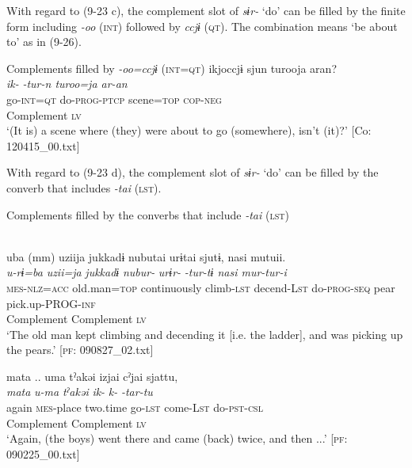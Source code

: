 With regard to (9-23 c), the complement slot of \textit{sɨr-} ‘do’ can be filled by the finite form including \textit{{}-oo} (\textsc{int}) followed by \textit{ccjɨ} (\textsc{qt}). The combination means ‘be about to’ as in (9-26).

\ea   Complements filled by \textit{{}-oo=ccjɨ} (\textsc{int}=\textsc{qt}) \label{ex:9.26}
 \gllll  ikjoccjɨ  sjun  turooja  aran?\\
    \textit{ik-}  \textit{-tur-n  turoo=ja  ar-an}\\
    go-\textsc{int}=\textsc{qt}  do-\textsc{prog}-\textsc{ptcp}  scene=\textsc{top}  \textsc{cop}-\textsc{neg}\\
    Complement  \textsc{lv}    \\
    \glt     ‘(It is) a scene where (they) were about to go (somewhere), isn’t (it)?’ [Co: 120415\_00.txt]
\z

  With regard to (9-23 d), the complement slot of \textit{sɨr-} ‘do’ can be filled by the converb that includes \textit{{}-tai} (\textsc{lst}).

\ea   Complements filled by the converbs that include \textit{{}-tai} (\textsc{lst}) \label{ex:9.27}

  \ea \label{ex:9.27a}\relax [= (8-93 b)]\\
    \gllll  uba  (mm)  uziija  jukkadɨ  nubutai  urɨtai  sjutɨ,  nasi  mutuii.\\
      \textit{u-rɨ=ba}    \textit{uzii=ja}  \textit{jukkadɨ}  \textit{nubur-} \textit{urɨr-}  \textit{-tur-tɨ  nasi  mur-tur-i}\\
      \textsc{mes}-\textsc{nlz}=\textsc{acc}    old.man=\textsc{top}  continuously  climb-\textsc{lst}  decend-L\textsc{st}  do-\textsc{prog}-\textsc{seq}  pear  pick.up-PROG-\textsc{inf}\\
              Complement                                   Complement  \textsc{lv}    \\
      \glt       ‘The old man kept climbing and decending it [i.e. the ladder], and was picking up the pears.’ [\textsc{pf}: 090827\_02.txt]

\ex \label{ex:9.27b} %
    \gllll  mata  ..  uma  tˀakəi  izjai  cˀjai  sjattu,\\
      \textit{mata}    \textit{u-ma}  \textit{tˀakəi}  \textit{ik-}  \textit{k-}  \textit{-tar-tu}\\
      again    \textsc{mes}-place  two.time  go-\textsc{lst}  come-L\textsc{st}  do-\textsc{pst}-\textsc{csl}\\
              Complement  Complement  \textsc{lv}\\
      \glt       ‘Again, (the boys) went there and came (back) twice, and then ...’ [\textsc{pf}: 090225\_00.txt]
    \z
\z

